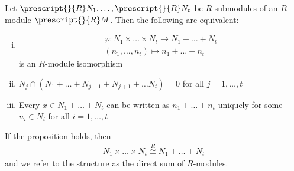 \documentclass{memoir}
\begin{document}
\begin{prop}
	Let \(\prescript{}{R}N_1,\ldots,\prescript{}{R}N_t\) be \(R\)-submodules of an \(R\)-module \(\prescript{}{R}M\). Then the following are equivalent:
	\begin{enumerate}[(i).]
		\item
			\begin{align*}
				\varphi:N_1\times \ldots\times N_t \to N_1+\ldots+N_t\\
				(n_1,\ldots,n_t) \mapsto n_1+\ldots+n_t
			\end{align*}
			is an \(R\)-module isomorphism
		\item \(N_j \cap (N_1+\ldots+N_{j-1}+N_{j+1} + \ldots N_t) = 0\) for all \(j=1,\ldots,t\)
		\item Every \(x \in N_1+\ldots+N_t\) can be written as \(n_1+\ldots+n_t\) uniquely for some \(n_i \in N_i\) for all \(i=1,\ldots,t\)
	\end{enumerate}
\end{prop}
If the proposition holds, then
\begin{align*}
	N_1\times \ldots\times N_t \stackrel{R}{\cong} N_1+\ldots+N_t
\end{align*}
and we refer to the structure as the direct sum of \(R\)-modules.
\end{document}
